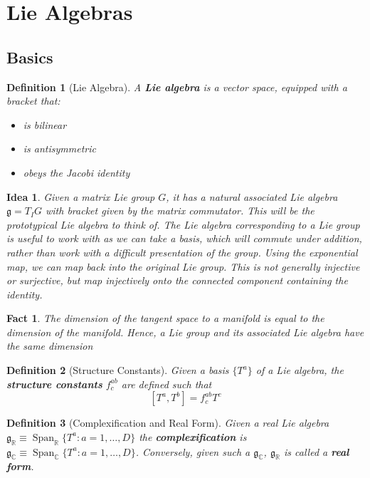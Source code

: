 \documentclass{article}
\newtheorem{definition}{Definition}[subsection]
\newtheorem{fact}{Fact}[subsection]
\newtheorem*{idea}{Idea}
\DeclareMathOperator{\spn}{Span}
\newcommand{\bam}[1]{\textbf{#1}}
\newcommand{\mf}[1]{\mathfrak{#1}}
\newcommand{\comm}[2][]{\left[ #1, #2 \right]}
\begin{document}
\section{Lie Algebras}

\subsection{Basics}

\begin{definition}[Lie Algebra] 

A \bam{Lie algebra} is a vector space, equipped with a bracket that:
\begin{itemize}
    \item is bilinear
    \item is antisymmetric
    \item obeys the Jacobi identity
\end{itemize}
\end{definition}

\begin{idea}
Given a matrix Lie group $G$, it has a natural associated Lie algebra $\mf{g}=T_{I}G$ with bracket given by the matrix commutator. This will be the prototypical Lie algebra to think of. The Lie algebra corresponding to a Lie group is useful to work with as we can take a basis, which will commute under addition, rather than work with a difficult presentation of the group.
Using the exponential map, we can map back into the original Lie group. This is not generally injective or surjective, but map injectively onto the connected component containing the identity. 
\end{idea}

\begin{fact}
The dimension of the tangent space to a manifold is equal to the dimension of the manifold. Hence, a Lie group and its associated Lie algebra have the same dimension
\end{fact}

\begin{definition}[Structure Constants]
Given a basis $\lbrace T^a \rbrace$ of a Lie algebra, the \bam{structure constants} $f^{ab}_c$ are defined such that 
\[
\comm[T^a]{T^b}=f^{ab}_c T^c
\]
\end{definition}

\begin{definition}[Complexification and Real Form]
Given a  real Lie algebra $\mf{g}_\mathbb{R}\equiv\spn_{\mathbb{R}}\lbrace T^a : a=1, \dots, D \rbrace$ the \bam{complexification}
is $\mf{g}_\mathbb{C}\equiv\spn_{\mathbb{C}}\lbrace T^a : a=1, \dots, D \rbrace$. Conversely, given such a $\mf{g}_\mathbb{C}$, $\mf{g}_\mathbb{R}$ is called a \bam{real form}.  
\end{definition}
\end{document}
